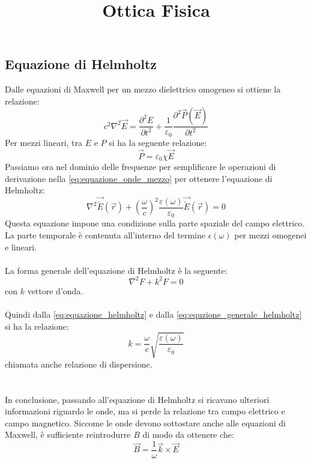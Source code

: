 \documentclass{article}
\title{Ottica Fisica}
\author{}
\date{}
\begin{document}
\maketitle

\subsection*{Equazione di Helmholtz}
Dalle equazioni di Maxwell per un mezzo dielettrico omogeneo si ottiene la relazione:
\begin{equation} \label{eq:equazione_onde_mezzo}
c^2\nabla^2 \overrightarrow{E} = \frac{\partial^2 E}{\partial t^2} + \frac{1}{\varepsilon_0} \frac{\partial^2 \overrightarrow{P}(\overrightarrow{E})}{\partial t^2}
\end{equation}
Per mezzi lineari, tra $E$ e $P$ si ha la seguente relazione:
\begin{equation*}
\overrightarrow{P} = \varepsilon_0 \chi \overrightarrow{E}
\end{equation*}
Passiamo ora nel dominio delle frequenze per semplificare le operazioni di derivazione nella \eqref{eq:equazione_onde_mezzo} per ottenere l'equazione di Helmholtz:
\begin{equation}	\label{eq:equazione_helmholtz}
\nabla^2 \overrightarrow{\tilde{E}}(\overrightarrow{r}) + \left(\frac{\omega}{c}\right)^2 \frac{\varepsilon(\omega)}{\varepsilon_0} \overrightarrow{\tilde{E}}(\overrightarrow{r}) = 0
\end{equation}
Questa equazione impone una condizione sulla parte spaziale del campo elettrico. La parte temporale è contenuta all'interno del termine $\epsilon(\omega)$ per mezzi omogenei e lineari.\\
\\
La forma generale dell'equazione di Helmholtz è la seguente:
\begin{equation} 	\label{eq:equzione_generale_helmholtz}
\nabla^2 F + k^2 F = 0
\end{equation}
con $k$ vettore d'onda.\\
\\
Quindi dalla \eqref{eq:equazione_helmholtz} e dalla \eqref{eq:equzione_generale_helmholtz} si ha la relazione:
\begin{equation*}
k = \frac{\omega}{c} \sqrt{\frac{\varepsilon(\omega)}{\varepsilon_0}}
\end{equation*}
chiamata anche relazione di dispersione.\\
\\
\\
In conclusione, passando all'equazione di Helmholtz si ricavano ulteriori informazioni riguardo le onde, ma si perde la relazione tra campo elettrico e campo magnetico. Siccome le onde devono sottostare anche alle equazioni di Maxwell, è sufficiente reintrodurre $B$ di modo da ottenere che:
\begin{equation*}
\overrightarrow{B} = \frac{1}{\omega} \overrightarrow{k} \times \overrightarrow{E}
\end{equation*}
\end{document}
